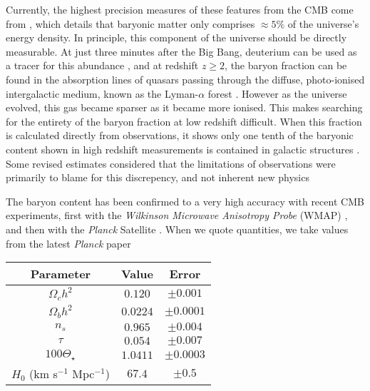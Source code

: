 Currently, the highest precision measures of these features from the CMB come from \cite{2018arXiv180706209P}, which details that baryonic matter only comprises $\approx 5 \% $ of the universe's energy density. In principle, this component of the universe should be directly measurable. At just three minutes after the Big Bang, deuterium can be used as a tracer for this abundance \citep{2007ARNPS..57..463S}, and at redshift $z \geqslant 2$, the baryon fraction can be found in the absorption lines of quasars passing through the diffuse, photo-ionised intergalactic medium, known as the Lyman-$\alpha$ forest \citep{1997ApJ...490..564W}. However as the universe evolved, this gas became sparser as it became more ionised. This makes searching for the entirety of the baryon fraction at low redshift difficult. When this fraction is calculated directly from observations, it shows only one tenth of the baryonic content shown in high redshift measurements is contained in galactic structures \citep{1992MNRAS.258P..14P}. Some revised estimates considered that the limitations of observations were primarily to blame for this discrepency, and not inherent new physics \citep{1994MNRAS.267...13B, 1998ApJ...503..518F}

The baryon content has been confirmed to a very high accuracy with recent CMB experiments, first with the \textit{Wilkinson Microwave Anisotropy Probe} (WMAP) \citep{2007ApJS..170..377S}, and then with the \textit{Planck} Satellite \citep{2018arXiv180706209P}. When we quote quantities, we take values from the latest \textit{Planck} paper


\begin{center}\label{table:params}
 \begin{tabular}{||c c c||} 
 \hline
 Parameter & Value & Error \\
 \hline\hline
 $\Omega_c h^2$ & $0.120$ & $\pm 0.001$ \\
 \hline
 $\Omega_b h^2$ & $0.0224$ & $\pm 0.0001$ \\
 \hline
  $n_s$ & $0.965$ & $\pm 0.004$ \\
 \hline
  $\tau$  & $0.054$ & $\pm 0.007$ \\
 \hline
  $100 \Theta_\star$ & $1.0411$ & $\pm 0.0003$ \\
 \hline
 $H_0$ (km s$^{-1}$ Mpc$^{-1}$) & $67.4$ & $\pm 0.5$ \\
 \hline
\end{tabular}
\end{center}



